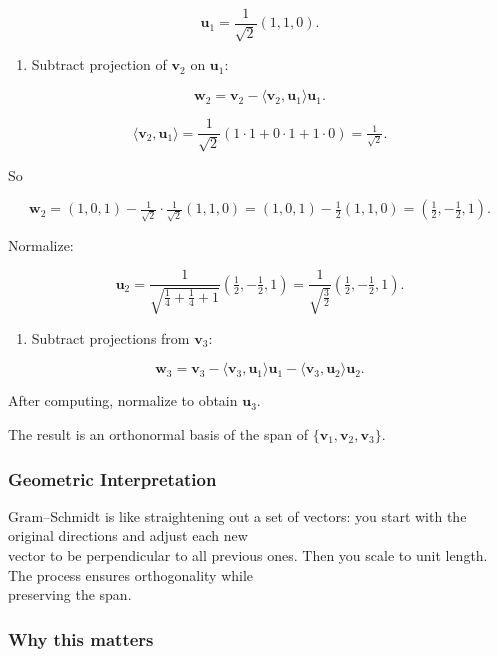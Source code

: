 \documentclass[
  12pt,
  a4paper,
]{article}
\begin{document}
\[\mathbf{u}_1 = \frac{1}{\sqrt{2}}(1,1,0).\]

\begin{enumerate}
\def\labelenumi{\arabic{enumi}.}
\item
  Subtract projection of \(\mathbf{v}_2\) on \(\mathbf{u}_1\):
\end{enumerate}

\[\mathbf{w}_2 = \mathbf{v}_2 - \langle \mathbf{v}_2,\mathbf{u}_1 \rangle \mathbf{u}_1.\]

\[\langle \mathbf{v}_2,\mathbf{u}_1 \rangle = \frac{1}{\sqrt{2}}(1\cdot 1 + 0\cdot 1 + 1\cdot 0) = \tfrac{1}{\sqrt{2}}.\]

So

\[\mathbf{w}_2 = (1,0,1) - \tfrac{1}{\sqrt{2}}\cdot \tfrac{1}{\sqrt{2}}(1,1,0)
= (1,0,1) - \tfrac{1}{2}(1,1,0)
= \left(\tfrac{1}{2}, -\tfrac{1}{2}, 1\right).\]

Normalize:

\[\mathbf{u}_2 = \frac{1}{\sqrt{\tfrac{1}{4}+\tfrac{1}{4}+1}} \left(\tfrac{1}{2}, -\tfrac{1}{2}, 1\right)
= \frac{1}{\sqrt{\tfrac{3}{2}}}\left(\tfrac{1}{2}, -\tfrac{1}{2}, 1\right).\]

\begin{enumerate}
\def\labelenumi{\arabic{enumi}.}
\item
  Subtract projections from \(\mathbf{v}_3\):
\end{enumerate}

\[\mathbf{w}_3 = \mathbf{v}_3 - \langle \mathbf{v}_3,\mathbf{u}_1 \rangle \mathbf{u}_1 - \langle \mathbf{v}_3,\mathbf{u}_2 \rangle \mathbf{u}_2.\]

After computing, normalize to obtain \(\mathbf{u}_3\).

The result is an orthonormal basis of the span of
\(\{\mathbf{v}_1,\mathbf{v}_2,\mathbf{v}_3\}\).

\subsubsection{Geometric
Interpretation}\label{geometric-interpretation-15}

Gram--Schmidt is like straightening out a set of vectors: you start with
the original directions and adjust each new\\
vector to be perpendicular to all previous ones. Then you scale to unit
length. The process ensures orthogonality while\\
preserving the span.

\subsubsection{Why this matters}\label{why-this-matters-26}
\end{document}
